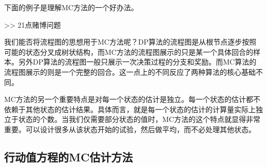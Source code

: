 \documentclass{ctexart}
\begin{document}
            下面的例子是理解MC方法的一个好办法。
            
            >> 21点赌博问题
            
            我们能否将流程图的思想用于MC方法呢？DP算法的流程图是从根节点逐步按照可能的状态分叉成树状结构，而MC方法的流程图展示的只是某一个具体回合的样本。另外DP算法的流程图一般只展示一次决策过程的分支和奖励。而MC算法的流程图展示的则是一个完整的回合。这一点上的不同反应了两种算法的核心基础不同。
            
            MC方法的另一个重要特点是对每一个状态的估计是独立。每一个状态的估计都不依赖于其他状态的估计结果。具体而言，就是每一个状态的估计的计算量实际上独立于状态的个数。当我们仅需要部分状态的值时，MC方法的这个特点就显得非常重要。可以设计很多从该状态开始的试验，然后做平均，而不必处理其他状态。
        \subsection{行动值方程的MC估计方法}
\end{document}
